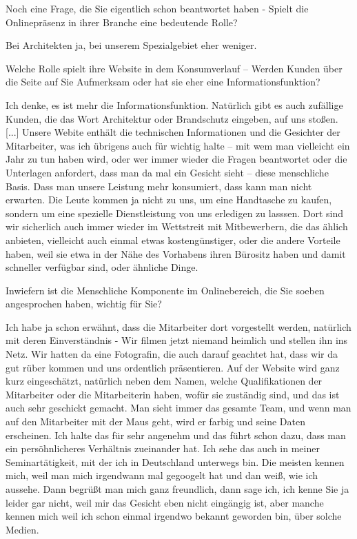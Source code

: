 \begin{description}
\Fabian Noch eine Frage, die Sie eigentlich schon beantwortet haben - Spielt die Onlinepräsenz in ihrer Branche eine bedeutende Rolle? %

\Andre Bei Architekten ja, bei unserem Spezialgebiet eher weniger.

\Fabian Welche Rolle spielt ihre Website in dem Konsumverlauf – Werden Kunden über die Seite auf Sie Aufmerksam oder hat sie eher eine Informationsfunktion?

\Andre Ich denke, es ist mehr die Informationsfunktion. Natürlich gibt es auch zufällige Kunden, die das Wort Architektur oder Brandschutz eingeben, auf uns stoßen. [...] Unsere Webite enthält die technischen Informationen und die Gesichter der Mitarbeiter, was ich übrigens auch für wichtig halte – mit wem man vielleicht ein Jahr zu tun haben wird, oder wer immer wieder die Fragen beantwortet oder die Unterlagen anfordert, dass man da mal ein Gesicht sieht – diese menschliche Basis. Dass man unsere Leistung mehr konsumiert, dass kann man nicht erwarten. Die Leute kommen ja nicht zu uns, um eine Handtasche zu kaufen, sondern um eine spezielle Dienstleistung von uns erledigen zu lasssen. Dort sind wir sicherlich auch immer wieder im Wettstreit mit Mitbewerbern, die das ählich anbieten, vielleicht auch einmal etwas kostengünstiger, oder die andere Vorteile haben, weil sie etwa in der Nähe des Vorhabens ihren Bürositz haben und damit schneller verfügbar sind, oder ähnliche Dinge.

\Fabian Inwiefern ist die Menschliche Komponente im Onlinebereich, die Sie soeben angesprochen haben, wichtig für Sie?

\Andre Ich habe ja schon erwähnt, dass die Mitarbeiter dort vorgestellt werden, natürlich mit deren Einverständnis - Wir filmen jetzt niemand heimlich und stellen ihn ins Netz. Wir hatten da eine Fotografin, die auch darauf geachtet hat, dass wir da gut rüber kommen und uns ordentlich präsentieren. Auf der Website wird ganz kurz eingeschätzt, natürlich neben dem Namen, welche Qualifikationen der Mitarbeiter oder die Mitarbeiterin haben, wofür sie zuständig sind, und das ist auch sehr geschickt gemacht. Man sieht immer das gesamte Team, und wenn man auf den Mitarbeiter mit der Maus geht, wird er farbig und seine Daten erscheinen. Ich halte das für sehr angenehm und das führt schon dazu, dass man ein persöhnlicheres Verhältnis zueinander hat. Ich sehe das auch in meiner Seminartätigkeit, mit der ich in Deutschland unterwegs bin. Die meisten kennen mich, weil man mich irgendwann mal gegoogelt hat und dan weiß, wie ich aussehe. Dann begrüßt man mich ganz freundlich, dann sage ich, ich kenne Sie ja leider gar nicht, weil mir das Gesicht eben nicht eingängig ist, aber manche kennen mich weil ich schon einmal irgendwo bekannt geworden bin, über solche Medien.


\end{description}

